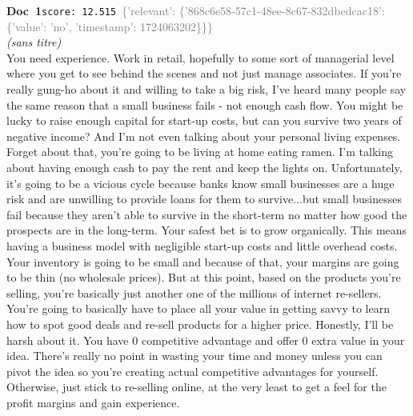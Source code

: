\documentclass[a4paper,11pt]{article}
\begin{document}
\begin{docenv}
{\footnotesize\textcolor{doccolor}{\textbf{Doc~1}}}\hfill{\tiny\texttt{score:~12.515}}\ {\tiny\textcolor{gray}{\{'relevant': \{'868c6e58-57c1-48ee-8c67-832dbedcac18': \{'value': 'no', 'timestamp': 1724063202\}\}\}}}\\[3pt]
{\small\textit{(sans titre)}}\\[2pt]
\vspace{2pt}
{\footnotesize 
You need experience. Work in retail, hopefully to some sort of managerial level where you get to see behind the scenes and not just manage associates.  If you're really gung-ho about it and willing to take a big risk, I've heard many people say the same reason that a small business fails - not enough cash flow. You might be lucky to raise enough capital for start-up costs, but can you survive two years of negative income? And I'm not even talking about your personal living expenses. Forget about that, you're going to be living at home eating ramen. I'm talking about having enough cash to pay the rent and keep the lights on. Unfortunately, it's going to be a vicious cycle because banks know small businesses are a huge risk and are unwilling to provide loans for them to survive...but small businesses fail because they aren't able to survive in the short-term no matter how good the prospects are in the long-term.   Your safest bet is to grow organically. This means having a business model with negligible start-up costs and little overhead costs. Your inventory is going to be small and because of that, your margins are going to be thin (no wholesale prices). But at this point, based on the products you're selling, you're basically just another one of the millions of internet re-sellers. You're going to basically have to place all your value in getting savvy to learn how to spot good deals and re-sell products for a higher price.   Honestly, I'll be harsh about it. You have 0 competitive advantage and offer 0 extra value in your idea. There's really no point in wasting your time and money unless you can pivot the idea so you're creating actual competitive advantages for yourself. Otherwise, just stick to re-selling online, at the very least to get a feel for the profit margins and gain experience.}
\end{docenv}
\end{document}
